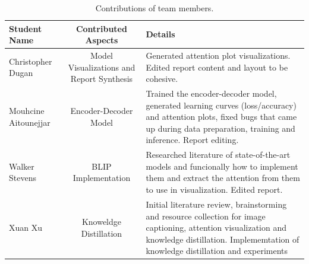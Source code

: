 \documentclass[10pt,twocolumn,letterpaper]{article}
\begin{document}
\begin{table}[]
\begin{center}
\begin{tabular}{|l|c|p{8cm}|}
\hline
Student Name & Contributed Aspects & Details \\
\hline\hline
Christopher Dugan & Model Visualizations and Report Synthesis & Generated attention plot visualizations. Edited report content and layout to be cohesive.  \\
Mouhcine Aitounejjar & Encoder-Decoder Model & Trained the encoder-decoder model, generated learning curves (loss/accuracy) and attention plots, fixed bugs that came up during data preparation, training and inference. Report editing.\\
Walker Stevens & BLIP Implementation & Researched literature of state-of-the-art models and funcionally how to implement them and extract the attention from them to use in visualization. Edited report.\\
Xuan Xu & Knoweldge Distillation & Initial literature review, brainstorming and resource collection for image captioning, attention visualization and knowledge distillation. Implememtation of knowledge distillation and experiments \\
\hline
\end{tabular}
\end{center}
\caption{Contributions of team members.}
\label{tab:contributions}
\end{table}

\newpage


{\small


}
\end{document}
